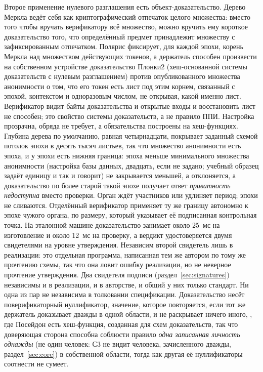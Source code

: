 Второе применение нулевого разглашения есть объект-доказательство. Дерево Меркла ведёт себя как
криптографический отпечаток целого множества: вместо того чтобы вручать верификатору всё
множество, можно вручить ему короткое доказательство того, что определённый предмет принадлежит
множеству с зафиксированным отпечатком. Полярис фиксирует, для каждой эпохи, корень Меркла над
множеством действующих токенов, а держатель способен произвести на собственном устройстве
доказательство Плонки2 (хеш-основанной системы доказательств с нулевым разглашением) против опубликованного множества анонимности о том, что его токен есть лист
под этим корнем, связанный с эпохой, контекстом и одноразовым числом, не открывая, какой именно
лист. Верификатор видит байты доказательства и открытые входы и восстановить лист не способен; это
свойство системы доказательств, а не правило ППИ. Настройка прозрачна, обряда не требует, а
обязательства построены на хеш-функциях. Глубина дерева по умолчанию, равная четырнадцати,
покрывает заданный схемой потолок эпохи в десять тысяч листьев, так что множество анонимности есть
эпоха, и у эпохи есть нижняя граница: эпоха меньше минимального множества
анонимности (настройка базы данных, двадцать, если не задано; учебный образец задаёт единицу и так и
говорит) не закрывается меньшей, а отклоняется, а доказательство по более старой такой эпохе
получает ответ \emph{приватность недоступна} вместо проверки. Орган ждёт участников или удлиняет
период; эпохи не сливаются. Отделённый верификатор применяет ту же границу автономно к эпохе
чужого органа, по размеру, который указывает её подписанная контрольная точка. На эталонной машине доказательство занимает около 25~мс на изготовление и около
12~мс на проверку, а вердикт удостоверяется двумя свидетелями на уровне утверждения. Независим
второй свидетель лишь в реализации: это отдельная программа, написанная тем же автором по тому же
прочтению схемы, так что она ловит ошибку реализации, но не неверное прочтение утверждения. Два
свидетеля подписи (раздел~\ref{sec:signatures}) независимы и в реализации, и в авторстве, и общий у
них только стандарт. Ни одна из пар не независима в толковании спецификации.
Доказательство несёт поверификаторный нуллификатор, значение, которое повторяется, если тот же держатель
доказывает дважды в одной области, и не раскрывает ничего иного,
, где Посейдон есть хеш-функция, созданная для схем
доказательств, так что доверяющая сторона способна соблюсти
правило \emph{одна записанная личность однажды} (не один человек: С3 не видит человека,
зачисленного дважды, раздел~\ref{sec:core}) в собственной области, тогда как другая её нуллификаторы
соотнести не сумеет. \sImpl

